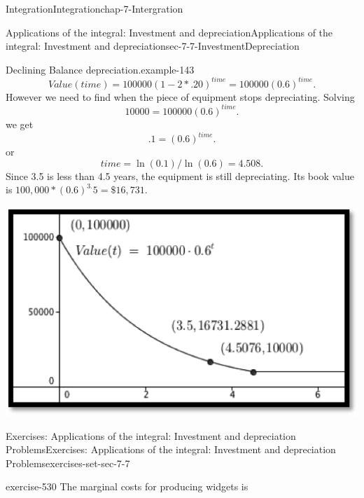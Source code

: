 \documentclass[oneside,10pt,]{book}
\numberwithin{equation}{section}
\begin{document}
\begin{chapterptx}{Integration}{}{Integration}{}{}{chap-7-Intergration}
\begin{sectionptx}{Applications of the integral: Investment and depreciation}{}{Applications of the integral: Investment and depreciation}{}{}{sec-7-7-InvestmentDepreciation}
\begin{example}{Declining Balance depreciation.}{example-143}
\begin{equation*}
Value(time)=100000(1-2*.20)^{time}=100000(0.6)^{time}.
\end{equation*}
\hypertarget{p-3049}{}%
However we need to find when the piece of equipment stops depreciating.  Solving%
%
\begin{equation*}
10000=100000(0.6)^{time}.
\end{equation*}
\hypertarget{p-3050}{}%
we get%
%
\begin{equation*}
.1=(0.6)^{time}.
\end{equation*}
\hypertarget{p-3051}{}%
or%
%
\begin{equation*}
time=\ln (0.1)/\ln (0.6) =4.508.
\end{equation*}
\hypertarget{p-3052}{}%
Since 3.5 is less than 4.5 years, the equipment is still depreciating.  Its book value is \(100,000*(0.6)^{3.}5 = \$16,731\).%
\begin{sidebyside}{1}{0.2}{0.2}{0}%
\begin{sbspanel}{0.6}%
\includegraphics[width=1\linewidth]{images/sec7-7-8.png}
\end{sbspanel}%
\end{sidebyside}%
\end{example}
%
%
\typeout{************************************************}
\typeout{************************************************}
%
\begin{exercises-subsection-numberless}{Exercises: Applications of the integral: Investment and depreciation Problems}{}{Exercises: Applications of the integral: Investment and depreciation Problems}{}{}{exercises-set-sec-7-7}
\begin{divisionexercise}{1}{}{}{exercise-530}%
\hypertarget{p-3053}{}%
The marginal costs for producing widgets is%

\end{divisionexercise}
\end{exercises-subsection-numberless}
\end{sectionptx}
\end{chapterptx}
\end{document}
